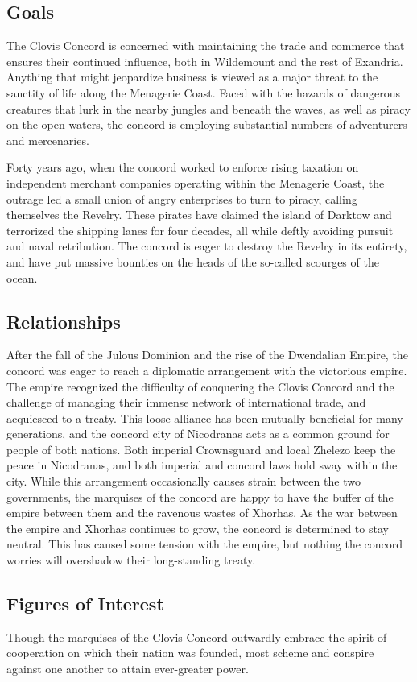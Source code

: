\documentclass[10pt,a4paper,twoside,bg=print,twocolumn,openany,nodeprecatedcode]{dndbook}
\begin{document}
\subsection{Goals}
The Clovis Concord is concerned with maintaining the trade and commerce that ensures their continued influence, both in Wildemount and the rest of Exandria. Anything that might jeopardize business is viewed as a major threat to the sanctity of life along the Menagerie Coast. Faced with the hazards of dangerous creatures that lurk in the nearby jungles and beneath the waves, as well as piracy on the open waters, the concord is employing substantial numbers of adventurers and mercenaries.

Forty years ago, when the concord worked to enforce rising taxation on independent merchant companies operating within the Menagerie Coast, the outrage led a small union of angry enterprises to turn to piracy, calling themselves the Revelry. These pirates have claimed the island of Darktow and terrorized the shipping lanes for four decades, all while deftly avoiding pursuit and naval retribution. The concord is eager to destroy the Revelry in its entirety, and have put massive bounties on the heads of the so-called scourges of the ocean.

\subsection{Relationships}
After the fall of the Julous Dominion and the rise of the Dwendalian Empire, the concord was eager to reach a diplomatic arrangement with the victorious empire. The empire recognized the difficulty of conquering the Clovis Concord and the challenge of managing their immense network of international trade, and acquiesced to a treaty. This loose alliance has been mutually beneficial for many generations, and the concord city of Nicodranas acts as a common ground for people of both nations. Both imperial Crownsguard and local Zhelezo keep the peace in Nicodranas, and both imperial and concord laws hold sway within the city. While this arrangement occasionally causes strain between the two governments, the marquises of the concord are happy to have the buffer of the empire between them and the ravenous wastes of Xhorhas. As the war between the empire and Xhorhas continues to grow, the concord is determined to stay neutral. This has caused some tension with the empire, but nothing the concord worries will overshadow their long-standing treaty.

\subsection{Figures of Interest}
Though the marquises of the Clovis Concord outwardly embrace the spirit of cooperation on which their nation was founded, most scheme and conspire against one another to attain ever-greater power.
\end{document}
